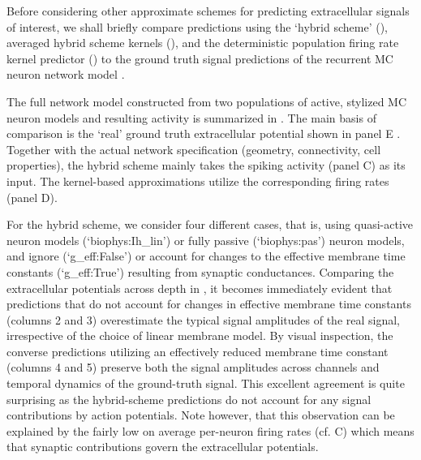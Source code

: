 Before considering other approximate schemes for predicting extracellular signals of interest, 
we shall briefly compare predictions using the `hybrid scheme' (),
averaged hybrid scheme kernels (),
and the deterministic population firing rate kernel predictor () to the ground truth signal predictions of the recurrent MC neuron network model 
. 

The full network model constructed from two populations of active, stylized MC neuron models and resulting activity is summarized in . 
The main basis of comparison is the `real' ground truth extracellular potential shown in panel E 
. 
Together with the actual network specification (geometry, connectivity, cell properties), 
the hybrid scheme mainly takes the spiking activity (panel C) as its input. 
The kernel-based approximations utilize the corresponding firing rates (panel D). 

For the hybrid scheme, 
we consider four different cases, that is, using quasi-active neuron models (`biophys:Ih\_lin') or fully passive (`biophys:pas') neuron models, 
and ignore (`g\_eff:False') or account for changes to the effective membrane time constants (`g\_eff:True') resulting from synaptic conductances.  
Comparing the extracellular potentials across depth in ,
it becomes immediately evident that predictions that do not account for changes in effective membrane time constants (columns 2 and 3) overestimate the typical signal amplitudes of the real signal, 
irrespective of the choice of linear membrane model. 
By visual inspection, the converse predictions utilizing an effectively reduced membrane time constant (columns 4 and 5) preserve both the signal amplitudes across channels and temporal dynamics of the ground-truth signal. 
This excellent agreement is quite surprising as the hybrid-scheme predictions do not account for any signal contributions by action potentials. 
Note however, that this observation can be explained by the fairly low on average per-neuron firing rates (cf. C) which means that synaptic contributions govern the extracellular potentials. 

